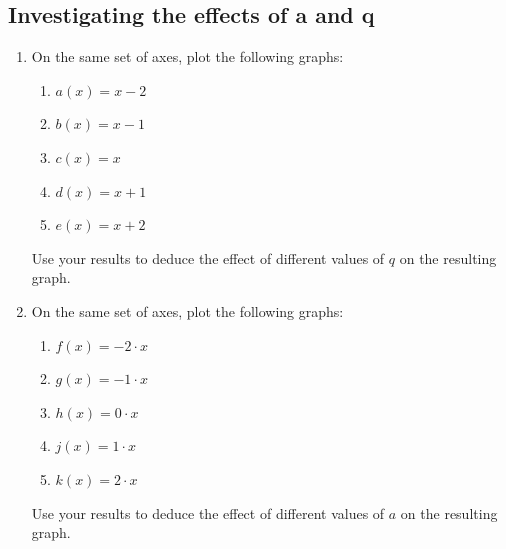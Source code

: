 \subsection*{Investigating the effects of a and q}
\nopagebreak
\begin{enumerate}[noitemsep, label=\textbf{\arabic*}. ] 
\item On the same set of axes, plot the following graphs:
    \begin{enumerate}[noitemsep, label=\textbf{\alph*}. ] 
    \item $a(x)=x-2$
    \item $b(x)=x-1$
    \item $c(x)=x$
    \item $d(x)=x+1$
    \item $e(x)=x+2$
    \end{enumerate}
Use your results to deduce the effect of different values of $q$ on the resulting graph.
\item On the same set of axes, plot the following graphs:
    \begin{enumerate}[noitemsep, label=\textbf{\alph*}. ] 
    \item $f(x)=-2\ensuremath{\cdot}x$
    \item $g(x)=-1\ensuremath{\cdot}x$
    \item $h(x)=0\ensuremath{\cdot}x$
    \item $j(x)=1\ensuremath{\cdot}x$\item $k(x)=2\ensuremath{\cdot}x$
    \end{enumerate}
Use your results to deduce the effect of different values of $a$ on the resulting graph.
\end{enumerate}

